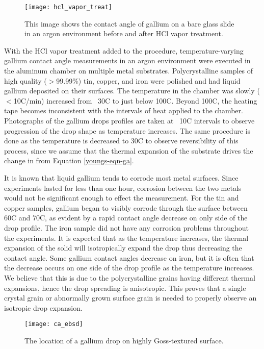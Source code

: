 \begin{wrapfigure}[8]{L}{0.6\linewidth}
	\centering
	\texttt{[image: hcl\_vapor\_treat]}
	\caption{This image shows the contact angle of gallium on a bare glass slide in an argon environment before and after HCl vapor treatment.}
	\label{fig:hcl_vapor_treat}
\end{wrapfigure}

With the HCl vapor treatment added to the procedure, temperature-varying gallium contact angle measurements in an argon environment were executed in the aluminum chamber on multiple metal substrates. Polycrystalline samples of high quality ($>$99.99\%) tin, copper, and iron were polished and had liquid gallium deposited on their surfaces. The temperature in the chamber was slowly ($<$10\degree C/min) increased from ~30\degree C to just below 100\degree C. Beyond 100\degree C, the heating tape becomes inconsistent with the intervals of heat applied to the chamber. Photographs of the gallium drops profiles are taken at ~10\degree C intervals to observe progression of the drop shape as temperature increases. The same procedure is done as the temperature is decreased to 30\degree C to observe reversibility of this process, since we assume that the thermal expansion of the substrate drives the change in \gamSL from Equation \ref{youngs-eqn-ga}. 

It is known that liquid gallium tends to corrode most metal surfaces.\cite{Lewandowski2015,Narh1998,Fitzgerald1999} Since experiments lasted for less than one hour, corrosion between the two metals would not be significant enough to effect the measurement. For the tin and copper samples, gallium began to visibly corrode through the surface between 60\degree C and 70\degree C, as evident by a rapid contact angle decrease on only side of the drop profile. The iron sample did not have any corrosion problems throughout the experiments. It is expected that as the temperature increases, the thermal expansion of the solid will isotropically expand the drop thus decreasing the contact angle. Some gallium contact angles decrease on iron, but it is often that the decrease occurs on one side of the drop profile as the temperature increases. We believe that this is due to the polycrystalline grains having different thermal expansions, hence the drop spreading is anisotropic. This proves that a single crystal grain or abnormally grown surface grain is needed to properly observe an isotropic drop expansion. 

\begin{wrapfigure}[8]{R}{0.5\linewidth}
	\centering
	\texttt{[image: ca\_ebsd]}
	\caption{The location of a gallium drop on highly Goss-textured surface.}
	\label{fig:ca_ebsd}
\end{wrapfigure}

